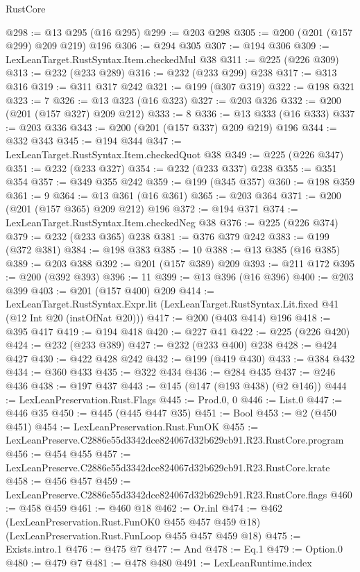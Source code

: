 \begin{lexlean}{RustCore}
\begin{coremodule}
@298 := @13 @295 (@16 @295)
@299 := @203 @298
@305 := @200 (@201 (@157 @299) @209 @219) @196
@306 := @294 @305
@307 := @194 @306
@309 := LexLeanTarget.RustSyntax.Item.checkedMul @38
@311 := @225 (@226 @309)
@313 := @232 (@233 @289)
@316 := @232 (@233 @299) @238
@317 := @313 @316
@319 := @311 @317 @242
@321 := @199 (@307 @319)
@322 := @198 @321
@323 := 7
@326 := @13 @323 (@16 @323)
@327 := @203 @326
@332 := @200 (@201 (@157 @327) @209 @212)
@333 := 8
@336 := @13 @333 (@16 @333)
@337 := @203 @336
@343 := @200 (@201 (@157 @337) @209 @219) @196
@344 := @332 @343
@345 := @194 @344
@347 := LexLeanTarget.RustSyntax.Item.checkedQuot @38
@349 := @225 (@226 @347)
@351 := @232 (@233 @327)
@354 := @232 (@233 @337) @238
@355 := @351 @354
@357 := @349 @355 @242
@359 := @199 (@345 @357)
@360 := @198 @359
@361 := 9
@364 := @13 @361 (@16 @361)
@365 := @203 @364
@371 := @200 (@201 (@157 @365) @209 @212) @196
@372 := @194 @371
@374 := LexLeanTarget.RustSyntax.Item.checkedNeg @38
@376 := @225 (@226 @374)
@379 := @232 (@233 @365) @238
@381 := @376 @379 @242
@383 := @199 (@372 @381)
@384 := @198 @383
@385 := 10
@388 := @13 @385 (@16 @385)
@389 := @203 @388
@392 := @201 (@157 @389) @209
@393 := @211 @172
@395 := @200 (@392 @393)
@396 := 11
@399 := @13 @396 (@16 @396)
@400 := @203 @399
@403 := @201 (@157 @400) @209
@414 := LexLeanTarget.RustSyntax.Expr.lit
    (LexLeanTarget.RustSyntax.Lit.fixed @41 (@12 Int @20 (instOfNat @20)))
@417 := @200 (@403 @414) @196
@418 := @395 @417
@419 := @194 @418
@420 := @227 @41
@422 := @225 (@226 @420)
@424 := @232 (@233 @389)
@427 := @232 (@233 @400) @238
@428 := @424 @427
@430 := @422 @428 @242
@432 := @199 (@419 @430)
@433 := @384 @432
@434 := @360 @433
@435 := @322 @434
@436 := @284 @435
@437 := @246 @436
@438 := @197 @437
@443 := @145 (@147 (@193 @438) (@2 @146))
@444 := LexLeanPreservation.Rust.Flags
@445 := Prod.{0, 0}
@446 := List.{0}
@447 := @446 @35
@450 := @445 (@445 @447 @35)
@451 := Bool
@453 := @2 (@450 @451)
@454 := LexLeanPreservation.Rust.FunOK
@455 := LexLeanPreserve.C2886e55d3342dce824067d32b629cb91.R23.RustCore.program
@456 := @454 @455
@457 := LexLeanPreserve.C2886e55d3342dce824067d32b629cb91.R23.RustCore.krate
@458 := @456 @457
@459 := LexLeanPreserve.C2886e55d3342dce824067d32b629cb91.R23.RustCore.flags
@460 := @458 @459
@461 := @460 @18
@462 := Or.inl
@474 := @462
    (LexLeanPreservation.Rust.FunOK0 @455 @457 @459 @18)
    (LexLeanPreservation.Rust.FunLoop @455 @457 @459 @18)
@475 := Exists.intro.{1}
@476 := @475 @7
@477 := And
@478 := Eq.{1}
@479 := Option.{0}
@480 := @479 @7
@481 := @478 @480
@491 := LexLeanRuntime.index

\end{coremodule}
\end{lexlean}
